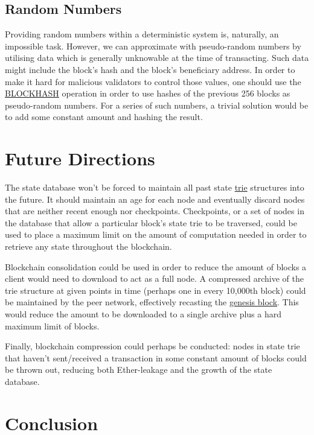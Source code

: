 \documentclass[9pt,oneside]{amsart}
\begin{document}
\begin{multicols}{2}
\subsection{Random Numbers}
Providing random numbers within a deterministic system is, naturally, an impossible task. However, we can approximate with pseudo-random numbers by utilising data which is generally unknowable at the time of transacting. Such data might include the block's hash and the block's beneficiary address. In order to make it hard for malicious validators to control those values, one should use the {\small \hyperlink{blockhash}{BLOCKHASH}} operation in order to use hashes of the previous 256 blocks as pseudo-random numbers. For a series of such numbers, a trivial solution would be to add some constant amount and hashing the result.

\section{Future Directions} \label{ch:future}

The state database won't be forced to maintain all past state \hyperlink{trie}{trie} structures into the future. It should maintain an age for each node and eventually discard nodes that are neither recent enough nor checkpoints. Checkpoints, or a set of nodes in the database that allow a particular block's state trie to be traversed, could be used to place a maximum limit on the amount of computation needed in order to retrieve any state throughout the blockchain.

Blockchain consolidation could be used in order to reduce the amount of blocks a client would need to download to act as a full node. A compressed archive of the trie structure at given points in time (perhaps one in every 10,000th block) could be maintained by the peer network, effectively recasting the \hyperlink{Genesis_Block}{genesis block}. This would reduce the amount to be downloaded to a single archive plus a hard maximum limit  of blocks.

Finally, blockchain compression could perhaps be conducted: nodes in state trie that haven't sent/received a transaction in some constant amount of blocks could be thrown out, reducing both Ether-leakage and the growth of the state database.

\section{Conclusion} \label{ch:conclusion}


\end{multicols}
\end{document}

